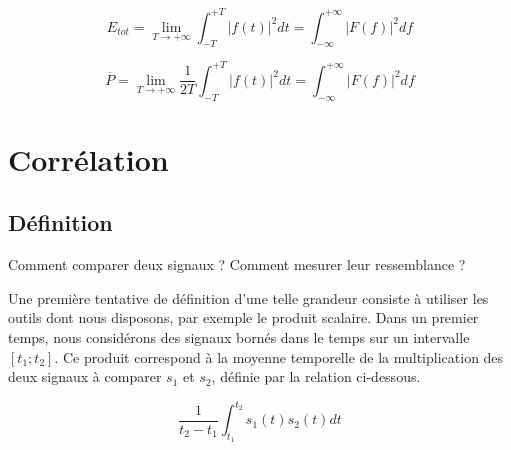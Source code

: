 	\begin{equation}\label{Parseval_non_periodique_Efinie}
	E_{tot}= \lim_{T \to +\infty}\int_{-T}^{+T}|f(t)|^{2}dt=\int_{-\infty}^{+\infty}|F(f)|^{2}df
	\end{equation}
	
	\begin{equation}\label{Parseval_non_periodique_Pfinie}
	\overline{P}= \lim_{T \to +\infty}\frac{1}{2T}\int_{-T}^{+T}|f(t)|^{2}dt=\int_{-\infty}^{+\infty}|F(f)|^{2}df
	\end{equation}

	
	
	\section{Corrélation}

	
	\subsection{Définition}
	Comment comparer deux signaux ? Comment mesurer leur ressemblance ?  
	
	Une première tentative de définition d'une telle grandeur consiste à utiliser les outils dont nous disposons, par exemple le produit scalaire. Dans un premier temps, nous considérons des signaux bornés dans le temps sur un intervalle $[t_{1};t_{2}]$. Ce produit correspond à la moyenne temporelle de la multiplication des deux signaux à comparer $s_{1}$ et $s_{2}$, définie par la relation ci-dessous.
	
	\begin{equation*}
	\frac{1}{t_{2}-t_{1}}\int_{t_{1}}^{t_{2}}s_{1}(t)s_{2}(t)dt
	\end{equation*}
	
